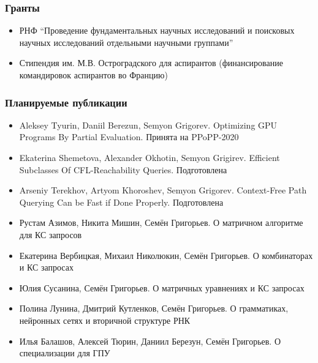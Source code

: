 \documentclass[xcolor=table]{beamer}
\begin{document}
\begin{frame}[fragile]

  \frametitle{Гранты}
\begin{itemize}

      \item[\faHourglassHalf] РНФ ``Проведение фундаментальных научных исследований и поисковых научных исследований отдельными научными группами''

      \item[\faHourglassHalf] Стипендия им. М.В. Остроградского для аспирантов (финансирование командировок аспирантов во Францию)

\end{itemize}
\end{frame}


\begin{frame}[fragile]

  \frametitle{Планируемые публикации}
\begin{itemize}
      \item[\faHourglassHalf] Aleksey Tyurin, Daniil Berezun, Semyon Grigorev. Optimizing GPU Programs By Partial Evaluation. Принята на PPoPP-2020
      \item[\faHourglassHalf] Ekaterina Shemetova, Alexander Okhotin, Semyon Grigirev. Efficient Subclasses Of CFL-Reachability Queries. Подготовлена
      \item[\faHourglassHalf] Arseniy Terekhov, Artyom Khoroshev, Semyon Grigorev. Context-Free Path Querying Can be Fast if Done Properly. Подготовлена
      \pause
      \item[\faGears] Рустам Азимов, Никита Мишин, Семён Григорьев. О матричном алгоритме для КС запросов
      \item[\faGears] Екатерина Вербицкая, Михаил Николюкин, Семён Григорьев. О комбинаторах и КС запросах
      \item[\faGears] Юлия Сусанина, Семён Григорьев. О матричных уравнениях и КС запросах
      \item[\faGears] Полина Лунина, Дмитрий Кутленков, Семён Григорьев. О грамматиках, нейронных сетях и вторичной структуре РНК
      \item[\faGears] Илья Балашов, Алексей Тюрин, Даниил Березун, Семён Григорьев. О специализации для ГПУ
\end{itemize}
\end{frame}
\end{document}
